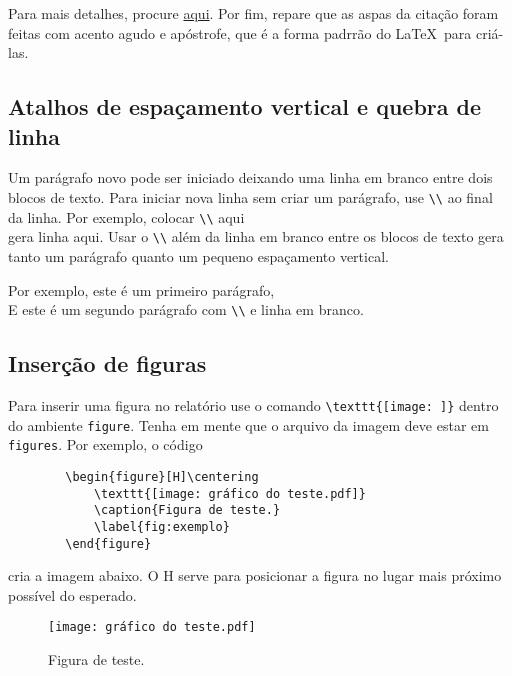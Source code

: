         Para mais detalhes, procure
        \href{https://www.overleaf.com/learn/latex/Bold%2C_italics_and_underlining#Underlined_text}{aqui}.
        Por fim, repare que as aspas da citação foram feitas com acento agudo e apóstrofe, que é a forma padrrão do \LaTeX~para criá-las.

    \subsection{Atalhos de espaçamento vertical e quebra de linha}
        Um parágrafo novo pode ser iniciado deixando uma linha em branco entre dois blocos de texto.
        Para iniciar nova linha sem criar um parágrafo, use \verb|\\| ao final da linha.
        Por exemplo, colocar \verb|\\| aqui\\
        gera linha aqui.
        Usar o \verb|\\| além da linha em branco entre os blocos de texto gera tanto um parágrafo quanto um pequeno espaçamento vertical.
        
        Por exemplo, este é um primeiro parágrafo,\\

        E este é um segundo parágrafo com \verb|\\| e linha em branco.

    \subsection{Inserção de figuras}
        Para inserir uma figura no relatório use o comando \verb|\texttt{[image: ]}| dentro do ambiente {\tt figure}.
        Tenha em mente que o arquivo da imagem deve estar em {\tt figures}.
        Por exemplo, o código
        \begin{verbatim}
        \begin{figure}[H]\centering
            \texttt{[image: gráfico do teste.pdf]}
            \caption{Figura de teste.}
            \label{fig:exemplo}
        \end{figure}
        \end{verbatim}

        cria a imagem abaixo. O H serve para posicionar a figura no lugar mais próximo possível do esperado.
        \begin{figure}[H]\centering
            \texttt{[image: gráfico do teste.pdf]}
            \caption{Figura de teste.}
            \label{fig:exemplo}
        \end{figure}

